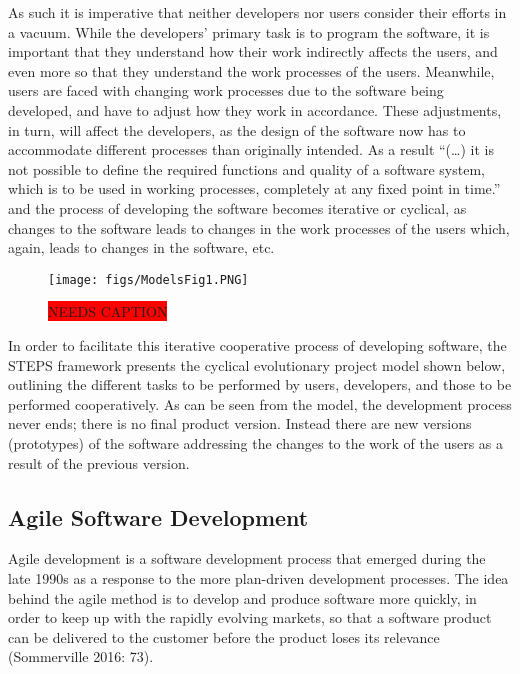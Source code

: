 As such it is imperative that neither developers nor users consider their efforts in a vacuum. While the developers’ primary task is to program the software, it is important that they understand how their work indirectly affects the users, and even more so that they understand the work processes of the users. Meanwhile, users are faced with changing work processes due to the software being developed, and have to adjust how they work in accordance. These adjustments, in turn, will affect the developers, as the design of the software now has to accommodate different processes than originally intended. As a result “(…) it is not possible to define the required functions and quality of a software system, which is to be used in working processes, completely at any fixed point in time.” \cite[pp. 53]{Floyd} and the process of developing the software becomes iterative or cyclical, as changes to the software leads to changes in the work processes of the users which, again, leads to changes in the software, etc.

\begin{figure}
  \centering
  \texttt{[image: figs/ModelsFig1.PNG]}
  \caption{\colorbox{red}{NEEDS CAPTION}}
  \label{ModelsFig1}
\end{figure}
In order to facilitate this iterative cooperative process of developing software, the STEPS framework presents the cyclical evolutionary project model shown below, outlining the different tasks to be performed by users, developers, and those to be performed cooperatively. As can be seen from the model, the development process never ends; there is no final product version. Instead there are new versions (prototypes) of the software addressing the changes to the work of the users as a result of the previous version.


\subsection{Agile Software Development}
Agile development is a software development process that emerged during the late 1990s as a response to the more plan-driven development processes. The idea behind the agile method is to develop and produce software more quickly, in order to keep up with the rapidly evolving markets, so that a software product can be delivered to the customer before the product loses its relevance (Sommerville 2016: 73).

